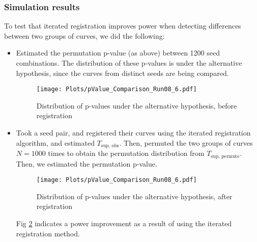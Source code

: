 \subsubsection{Simulation results}
To test that iterated registration improves power when detecting differences between two groups of curves, we did the following:
\begin{itemize}
\item Estimated the permutation p-value (as above) between 1200 seed combinations. The distribution of these p-values is under the alternative hypothesis, since the curves from distinct seeds are being compared.
\begin{figure}[H]
\begin{center}
\texttt{[image: Plots/pValue\_Comparison\_Run08\_6.pdf]}
\end{center}
\caption{Distribution of p-values under the alternative hypothesis, before registration}
\label{fig:BeforeRegist}
\end{figure}

\item Took a seed pair, and registered their curves using the iterated registration algorithm, and estimated $T_{\text{sup, obs}}$. Then, permuted the two groups of curves $N = 1000$ times to obtain the permutation distribution from  $T_{\text{sup, permute}}$. Then, we estimated the permutation p-value. 
\begin{figure}[H]
\begin{center}
\texttt{[image: Plots/pValue\_Comparison\_Run08\_6.pdf]}
\end{center}
\caption{Distribution of p-values under the alternative hypothesis, after registration}
\label{fig:AfterRegist}
\end{figure}

Fig \ref{fig:AfterRegist} indicates a power improvement as a result of using the iterated registration method. 

\end{itemize} 


